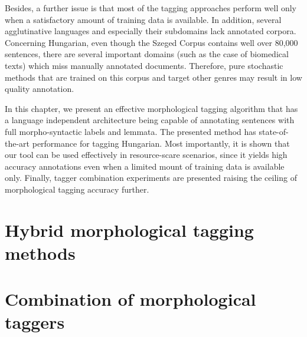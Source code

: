 Besides, a further issue is that most of the tagging approaches perform well only when a satisfactory amount of training data is available. 
In addition, several agglutinative languages and especially their subdomains lack annotated corpora. 
Concerning Hungarian, even though the Szeged Corpus contains well over 80,000 sentences, there are several important domains (such as the case of biomedical texts) which miss manually annotated documents. 
Therefore, pure stochastic methods that are trained on this corpus and target other genres may result in low quality annotation. 

In this chapter, we present an effective morphological tagging algorithm that has a language independent architecture being capable of annotating sentences with full morpho-syntactic labels and lemmata. 
The presented method has state-of-the-art performance for tagging Hungarian.
Most importantly, it is shown that our tool can be used effectively in resource-scare scenarios, since it yields high accuracy annotations even when a limited mount of training data is available only. 
Finally, tagger combination experiments are presented raising the ceiling of morphological tagging accuracy further. 

\section{Hybrid morphological tagging methods}\label{sec:tagging}



\section{Combination of morphological taggers}\label{sec:combination}


 
